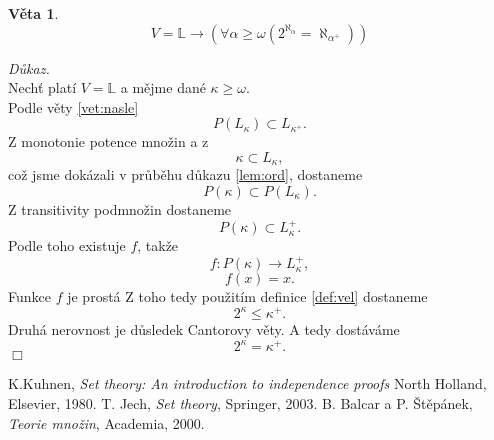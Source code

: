 \documentclass[12pt,a4paper]{article}
\newtheorem{veta}{V\v{e}ta}[section]%
\newenvironment{proof}
{\noindent \textit{D\r{u}kaz.}}
{\hspace*{\fill} $\Box$}
\begin{document}
\begin{veta}
\[ V=\mathbb{L} \rightarrow (\forall \alpha \geq \omega  (2^{\aleph_\alpha}= {\aleph_{\alpha^+}}))   \]
\end{veta}
\begin{proof}~\\
Nech\v{t} plat\'{i} $ V=\mathbb{L} $ a m\v{e}jme dan\'{e} $ \kappa \geq \omega .$ \\ Podle v\v{e}ty \ref{vet:nasle}
\[ P(L_\kappa)\subset L_{\kappa^{+}} .\]
Z monotonie potence mno\v{z}in a z \[ \kappa \subset L_\kappa, \]co\v{z} jsme dok\'{a}zali v pr\r{u}b\v{e}hu d\r{u}kazu \ref{lem:ord},
dostaneme 
 \[ P(\kappa) \subset P(L_\kappa) .\]
Z transitivity podmno\v{z}in dostaneme
\[ P(\kappa)\subset L_\kappa^+ .\]
Podle toho existuje $ f $, tak\v{z}e \[ f:P(\kappa) \rightarrow L_\kappa^+ ,\] \[ f(x)=x .\] Funkce $ f $ je prost\'{a} 
Z toho tedy pou\v{z}it\'{i}m definice \ref{def:vel} dostaneme \[ 2^\kappa \leq \kappa^+.\]
Druh\'{a} nerovnost je d\r{u}sledek Cantorovy v\v{e}ty. A tedy dost\'{a}v\'{a}me  
\[ 2^\kappa = \kappa^+ .\]
\end{proof}
\clearpage\fancyhead[R]{\slshape\nouppercase{\leftmark}} %
\begin{thebibliography}{Gam06}
 K.Kuhnen, \textit{Set theory: An introduction to independence proofs} North Holland, Elsevier, 1980.
 T. Jech, \textit{Set theory}, Springer, 2003. 
B. Balcar a P. \v{S}t\v{e}p\'{a}nek,\textit{ Teorie mno\v{z}in}, Academia, 2000.
\end{thebibliography}
\end{document}
